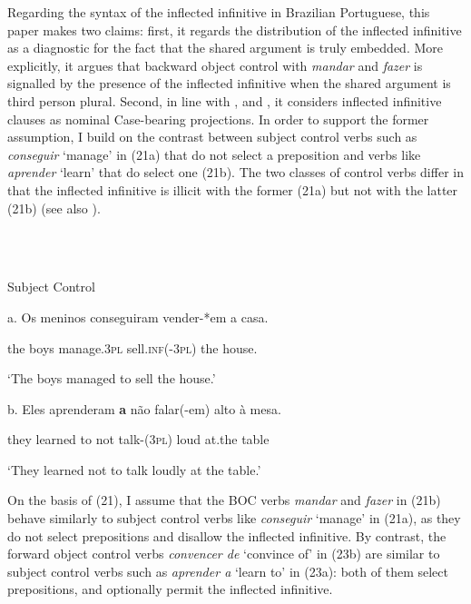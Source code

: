 \documentclass[output=paper]{langsci/langscibook}
\begin{document}
Regarding the syntax of the inflected infinitive in Brazilian Portuguese, this paper makes two claims: first, it regards the distribution of the inflected infinitive as a diagnostic for the fact that the shared argument is truly embedded. More explicitly, it argues that backward object control with \textit{mandar} and \textit{fazer} is signalled by the presence of the inflected infinitive when the shared argument is third person plural. Second, in line with \citet{Raposo1987}, \citet{Nunes1995} and \citet{Pires2010}, it considers inflected infinitive clauses as nominal Case-bearing projections. In order to support the former assumption, I build on the contrast between subject control verbs such as \textit{conseguir} ‘manage’ in (21a) that do not select a preposition and verbs like \textit{aprender} ‘learn’ that do select one (21b). The two classes of control verbs differ in that the inflected infinitive is illicit with the former (21a) but not with the latter (21b) (see also \citealt{Modesto2010}). 

\ea%
    \label{ex:key:21}
    \gll\\
        \\
    \glt
    \z

          Subject Control

a.    Os meninos conseguiram   vender-*em   a casa.  

             the boys      manage.\textsc{3pl}    sell\textsc{.inf(-3pl)}  the house.

    ‘The boys managed to sell the house.’

  b.     Eles    aprenderam \textbf{a}  não   falar(-em)     alto  à        mesa.     

          they    learned        to not    talk-(\textsc{3pl})  loud at.the table  

    ‘They learned not to talk loudly at the table.’

On the basis of (21), I assume that the BOC verbs \textit{mandar} and \textit{fazer} in (21b) behave similarly to subject control verbs like \textit{conseguir} ‘manage’ in (21a), as they do not select prepositions and disallow the inflected infinitive. By contrast, the forward object control verbs \textit{convencer de} ‘convince of’ in (23b) are similar to subject control verbs such as \textit{aprender a} ‘learn to’ in (23a): both of them select prepositions, and optionally permit the inflected infinitive.

\ea%
    \label{ex:key:22}
    \gll\\
        \\
    \glt
    \z
\end{document}
